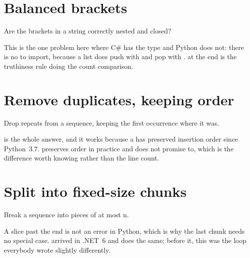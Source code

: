 \section{Balanced brackets}
\label{sec:appD-balanced}

\noindent
Are the brackets in a string correctly nested and closed?



\noindent
This is the one problem here where C\# has the type and Python does not: there is no  to import, because a list does push with  and pop with .  at the end is the truthiness rule doing the count comparison.

\section{Remove duplicates, keeping order}
\label{sec:appD-dedupe}

\noindent
Drop repeats from a sequence, keeping the first occurrence where it was.



\noindent
{} is the whole answer, and it works because a  has preserved insertion order since Python~3.7.  preserves order in practice and does not promise to, which is the difference worth knowing rather than the line count.

\section{Split into fixed-size chunks}
\label{sec:appD-chunk}

\noindent
Break a sequence into pieces of at most n.



\noindent
A slice past the end is not an error in Python, which is why the last chunk needs no special case.  arrived in .NET~6 and does the same; before it, this was the loop everybody wrote slightly differently.

